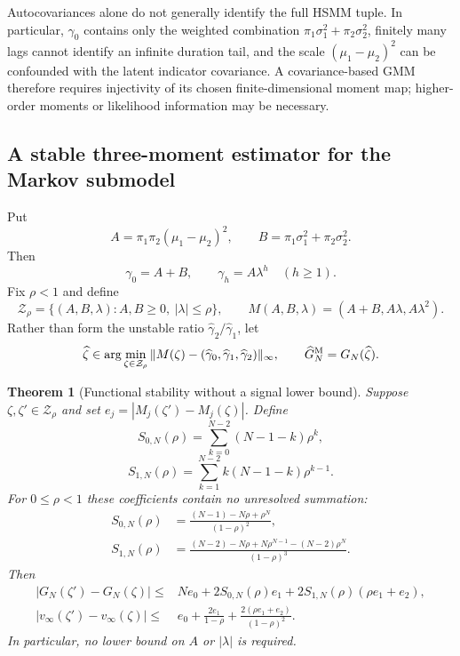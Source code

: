 \documentclass[11pt]{article}
\newtheorem{theorem}{Theorem}
\theoremstyle{definition}
\theoremstyle{remark}
\begin{document}
Autocovariances alone do not generally identify the full HSMM tuple.  In
particular, $\gamma_0$ contains only the weighted combination
$\pi_1\sigma_1^2+\pi_2\sigma_2^2$, finitely many lags cannot identify an
infinite duration tail, and the scale $(\mu_1-\mu_2)^2$ can be confounded with
the latent indicator covariance.  A covariance-based GMM therefore requires
injectivity of its chosen finite-dimensional moment map; higher-order moments
or likelihood information may be necessary.

\subsection{A stable three-moment estimator for the Markov submodel}

Put
\[
 A=\pi_1\pi_2(\mu_1-\mu_2)^2,
 \qquad B=\pi_1\sigma_1^2+\pi_2\sigma_2^2.
\]
Then
\[
 \gamma_0=A+B,\qquad \gamma_h=A\lambda^h\quad(h\ge1).
\]
Fix $\rho<1$ and define
\[
 \mathcal Z_\rho=\{(A,B,\lambda):A,B\ge0,\ |\lambda|\le\rho\},
 \qquad M(A,B,\lambda)=(A+B,A\lambda,A\lambda^2).
\]
Rather than form the unstable ratio $\widehat\gamma_2/\widehat\gamma_1$,
let
\begin{equation}
 \widehat\zeta\in\arg\min_{\zeta\in\mathcal Z_\rho}
 \|M(\zeta)-(\widehat\gamma_0,\widehat\gamma_1,
 \widehat\gamma_2)\|_\infty,
 \qquad \widehat G_N^{\rm M}=G_N(\widehat\zeta).
 \label{eq:mdmarkov}
\end{equation}

\begin{theorem}[Functional stability without a signal lower bound]
\label{thm:functional-stability}
Suppose $\zeta,\zeta'\in\mathcal Z_\rho$ and set
$e_j=|M_j(\zeta')-M_j(\zeta)|$.  Define
\[
 S_{0,N}(\rho)=\sum_{k=0}^{N-2}(N-1-k)\rho^k,
\]
\[
 S_{1,N}(\rho)=\sum_{k=1}^{N-2}k(N-1-k)\rho^{k-1}.
\]
For $0\le \rho<1$ these coefficients contain no unresolved summation:
\begin{align}
 S_{0,N}(\rho)
 &=\frac{(N-1)-N\rho+\rho^N}{(1-\rho)^2},
 \label{eq:S0closed}\\
 S_{1,N}(\rho)
 &=\frac{(N-2)-N\rho+N\rho^{N-1}-(N-2)\rho^N}
         {(1-\rho)^3}.
 \label{eq:S1closed}
\end{align}
Then
\begin{align}
 |G_N(\zeta')-G_N(\zeta)|
 \le{}&Ne_0+2S_{0,N}(\rho)e_1
       +2S_{1,N}(\rho)(\rho e_1+e_2),
 \label{eq:stableGN}\\
 |v_\infty(\zeta')-v_\infty(\zeta)|
 \le{}&e_0+\frac{2e_1}{1-\rho}
       +\frac{2(\rho e_1+e_2)}{(1-\rho)^2}.
 \label{eq:stablevinf}
\end{align}
In particular, no lower bound on $A$ or $|\lambda|$ is required.
\end{theorem}
\end{document}
